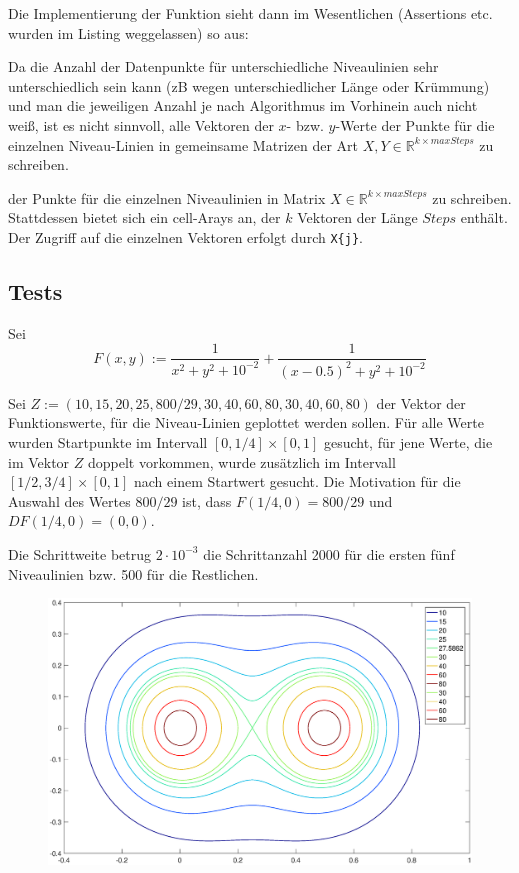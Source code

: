 \documentclass[a4paper,11pt,bibliography=totoc,listof=totoc,headinclude=true,cleardoublepage=empty,oneside]{scrartcl}
\newcommand{\R}{\mathbb{R}}
\begin{document}
Die Implementierung der Funktion sieht dann im Wesentlichen (Assertions etc. wurden im Listing weggelassen) so aus:




Da die Anzahl der Datenpunkte für unterschiedliche Niveaulinien sehr unterschiedlich sein kann (zB wegen unterschiedlicher Länge oder Krümmung) und man die jeweiligen Anzahl je nach Algorithmus im Vorhinein auch nicht weiß, ist es nicht sinnvoll, alle Vektoren der $x$- bzw. $y$-Werte der Punkte für die einzelnen Niveau-Linien in gemeinsame Matrizen der Art $X, Y \in \R^{k \times maxSteps}$ zu schreiben.


der Punkte für die einzelnen Niveaulinien in Matrix $X \in \R^{k \times maxSteps}$ zu schreiben. Stattdessen bietet sich ein cell-Arays an, der $k$ Vektoren der Länge $Steps$ enthält. Der Zugriff auf die einzelnen Vektoren erfolgt durch \verb|X{j}|.

\subsection{Tests}
Sei %
\[
F(x,y) := \frac{1}{x^2+y^2+10^{-2}} + \frac{1}{(x-0.5)^2+y^2+10^{-2}}
\]

Sei $Z:= (10,15,20,25,800/29,30,40,60,80,30,40,60,80)$ der Vektor der Funktionswerte, für die Niveau-Linien geplottet werden sollen. Für alle Werte wurden Startpunkte im Intervall $[0,1/4]\times[0,1]$ gesucht, für jene Werte, die im Vektor $Z$ doppelt vorkommen, wurde zusätzlich im Intervall $[1/2,3/4]\times[0,1]$ nach einem Startwert gesucht. Die Motivation für die Auswahl des Wertes $800/29$ ist, dass $F(1/4,0)=800/29$ und $DF(1/4,0)=(0,0)$.

Die Schrittweite betrug $2\cdot 10^{-3}$ die Schrittanzahl 2000 für die ersten fünf Niveaulinien bzw. 500 für die Restlichen.

\begin{figure}[H]
	\centering
	\includegraphics[trim = 41mm 0mm 35mm 0mm, clip, width=\linewidth]{plots/niveau/test5_}
	\label{fig:nivlines}
\end{figure}
\end{document}
